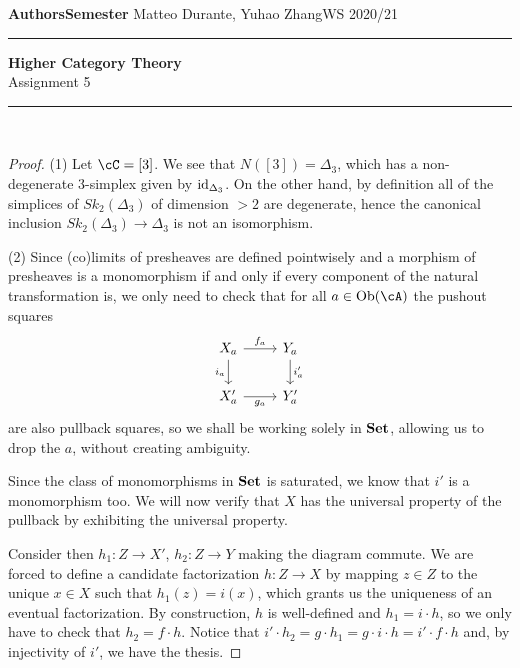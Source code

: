 \documentclass[a4paper,11pt,openany]{scrartcl}
\begin{document}
\noindent\textbf{Authors}\hfill\textbf{Semester} \linebreak
\vspace*{-.1cm} Matteo Durante, Yuhao Zhang\hfill WS 2020/21 \\

\noindent
\rule{\linewidth}{1pt}
\begin{center}
\Large
\textbf{Higher Category Theory} \\
Assignment 5
\end{center}
\rule{\linewidth}{1pt}
\\


\newcommand{\La}{\Lambda}
\newcommand{\pa}{\partial}
\newcommand{\ob}{\operatorname{Ob}}
\newcommand{\mor}{\operatorname{Mor}}
\newcommand{\sto}{\twoheadrightarrow}

\begin{proof}
    (1) Let $\cC=[3]$. We see that $N([3])=\Delta_3$, which has a non-degenerate
    3-simplex given by $\operatorname{id}_{\Delta_3}$. On the other hand, by definition all of
    the simplices of $Sk_2(\Delta_3)$ of dimension $>2$ are degenerate, hence
    the canonical inclusion $Sk_2(\Delta_3)\rightarrow \Delta_3$ is not an
    isomorphism.

    (2) Since (co)limits of presheaves are defined pointwisely and a morphism of
    presheaves is a monomorphism if and only if every component of the natural
    transformation is, we only need to check that for all $a\in\Ob(\cA)$ the
    pushout squares
    \[\begin{tikzcd}
	{X_a} & {Y_a} \\
	{X'_a} & {Y'_a}
	\arrow["{i_a}"', from=1-1, to=2-1]
	\arrow["{i'_a}", from=1-2, to=2-2]
	\arrow["{g_a}"', from=2-1, to=2-2]
	\arrow["{f_a}", from=1-1, to=1-2]
    \end{tikzcd}\]
    are also pullback squares, so we shall be working solely in $\operatorname{\mathbf{Set}}$, allowing
    us to drop the $a$, without creating ambiguity.

    Since the class of monomorphisms in $\operatorname{\mathbf{Set}}$ is saturated, we know that $i'$
    is a monomorphism too. We will now verify that $X$ has the universal
    property of the pullback by exhibiting the universal property.

    Consider then $h_1\colon Z\rightarrow X'$, $h_2\colon Z\rightarrow Y$
    making the diagram commute. We are forced to define a candidate
    factorization $h\colon Z\rightarrow X$ by mapping $z\in Z$ to the unique
    $x\in X$ such that $h_1(z)=i(x)$,
    which grants us the uniqueness of an eventual factorization.
    By construction, $h$ is well-defined and $h_1=i\cdot h$, so we only have
    to check that $h_2=f\cdot h$. Notice that $i'\cdot h_2=g\cdot
    h_1=g\cdot i\cdot h=i'\cdot f\cdot h$ and, by injectivity of $i'$,
    we have the thesis.
\end{proof}
\end{document}
